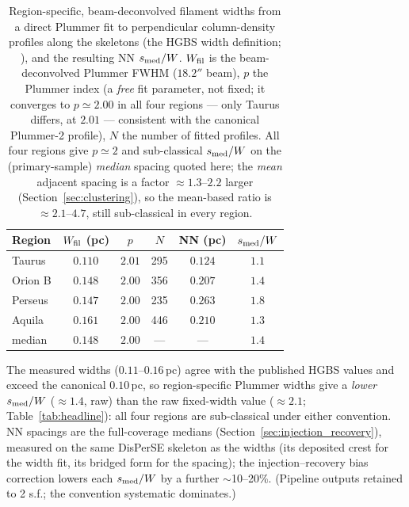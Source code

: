\documentclass[usenatbib,twoside,twocolumn]{mnras}
\begin{document}
\begin{table}
\caption{Region-specific, beam-deconvolved filament widths from a direct Plummer fit to perpendicular column-density profiles along the skeletons (the HGBS width definition; \citealt{Arzoumanian2019}), and the resulting NN $s_{\rm med}/W$. $W_{\rm fil}$ is the beam-deconvolved Plummer FWHM ($18.2''$ beam), $p$ the Plummer index (a \emph{free} fit parameter, not fixed; it converges to $p\simeq2.00$ in all four regions --- only Taurus differs, at $2.01$ --- consistent with the canonical Plummer-2 profile), $N$ the number of fitted profiles. All four regions give $p\simeq2$ and sub-classical $s_{\rm med}/W$ on the (primary-sample) \emph{median} spacing quoted here; the \emph{mean} adjacent spacing is a factor $\approx1.3$--$2.2$ larger (Section~\ref{sec:clustering}), so the mean-based ratio is $\approx2.1$--$4.7$, still sub-classical in every region.}
\label{tab:widths}
\footnotesize
\setlength{\tabcolsep}{3pt}
\begin{tabular}{p{1.7cm}ccccc}
\toprule
Region & $W_{\rm fil}$ (pc) & $p$ & $N$ & NN (pc) & $s_{\rm med}/W$ \\
\midrule
Taurus  & $0.110$ & $2.01$ & 295 & $0.124$ & $1.1$ \\
Orion B & $0.148$ & $2.00$ & 356 & $0.207$ & $1.4$ \\
Perseus & $0.147$ & $2.00$ & 235 & $0.263$ & $1.8$ \\
Aquila  & $0.161$ & $2.00$ & 446 & $0.210$ & $1.3$ \\
\midrule
median  & $0.148$ & $2.00$ & --- & --- & $1.4$ \\
\bottomrule
\end{tabular}
\par\vspace{2pt}
\footnotesize The measured widths ($0.11$--$0.16$\,pc) agree with the published HGBS values and exceed the canonical $0.10$\,pc, so region-specific Plummer widths give a \emph{lower} $s_{\rm med}/W$ ($\approx1.4$, raw) than the raw fixed-width value ($\approx2.1$; Table~\ref{tab:headline}): all four regions are sub-classical under either convention. NN spacings are the full-coverage medians (Section~\ref{sec:injection_recovery}), measured on the same DisPerSE skeleton as the widths (its deposited crest for the width fit, its bridged form for the spacing); the injection--recovery bias correction lowers each $s_{\rm med}/W$ by a further $\sim$10--20\%. (Pipeline outputs retained to 2 s.f.; the convention systematic dominates.)
\end{table}
\end{document}
